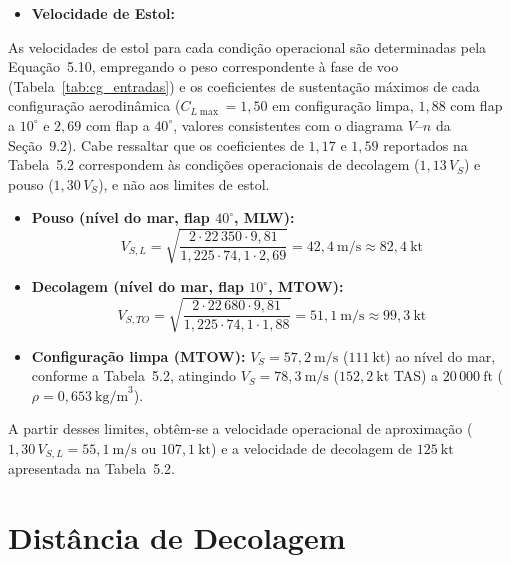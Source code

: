 \begin{itemize}
    \item \textbf{Velocidade de Estol:}
\end{itemize}

As velocidades de estol para cada condição operacional são determinadas pela Equação~5.10, empregando o peso correspondente à fase de voo (Tabela~\ref{tab:cg_entradas}) e os coeficientes de sustentação máximos de cada configuração aerodinâmica ($C_{L\max} = 1{,}50$ em configuração limpa, $1{,}88$ com flap a $10^\circ$ e $2{,}69$ com flap a $40^\circ$, valores consistentes com o diagrama $V\text{--}n$ da Seção~9.2). Cabe ressaltar que os coeficientes de $1{,}17$ e $1{,}59$ reportados na Tabela~5.2 correspondem às condições operacionais de decolagem ($1{,}13\,V_S$) e pouso ($1{,}30\,V_S$), e não aos limites de estol.

\begin{itemize}
    \item \textbf{Pouso (nível do mar, flap $40^\circ$, MLW):}
    \begin{equation}
        V_{S,L} = \sqrt{\frac{2 \cdot 22\,350 \cdot 9{,}81}{1{,}225 \cdot 74{,}1 \cdot 2{,}69}} = 42{,}4~\text{m/s} \approx 82{,}4~\text{kt}
    \end{equation}

    \item \textbf{Decolagem (nível do mar, flap $10^\circ$, MTOW):}
    \begin{equation}
        V_{S,TO} = \sqrt{\frac{2 \cdot 22\,680 \cdot 9{,}81}{1{,}225 \cdot 74{,}1 \cdot 1{,}88}} = 51{,}1~\text{m/s} \approx 99{,}3~\text{kt}
    \end{equation}

    \item \textbf{Configuração limpa (MTOW):} $V_S = 57{,}2~\text{m/s}$ ($111~\text{kt}$) ao nível do mar, conforme a Tabela~5.2, atingindo $V_S = 78{,}3~\text{m/s}$ ($152{,}2~\text{kt}$ TAS) a $20\,000~\text{ft}$ ($\rho = 0{,}653~\text{kg/m}^3$).
\end{itemize}

A partir desses limites, obtêm-se a velocidade operacional de aproximação ($1{,}30\,V_{S,L} = 55{,}1~\text{m/s}$ ou $107{,}1~\text{kt}$) e a velocidade de decolagem de $125~\text{kt}$ apresentada na Tabela~5.2.


\section{Distância de Decolagem}

